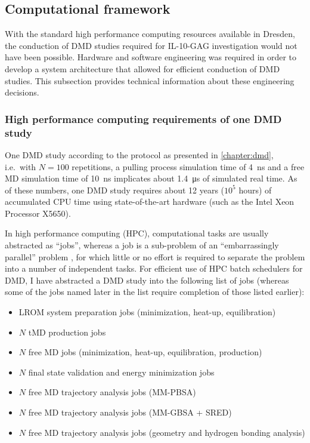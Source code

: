 \subsection{Computational framework}

With the standard high performance computing resources available in Dresden, the
conduction of DMD studies required for IL-10-GAG investigation would not have
been possible. Hardware and software engineering was required in order to
develop a system architecture that allowed for efficient conduction of DMD
studies. This subsection provides technical information about these engineering
decisions.

\subsubsection{High performance computing requirements of one DMD study}

One DMD study according to the protocol as presented in \cref{chapter:dmd},
i.e.\ with $N = 100$ repetitions, a pulling process simulation time of
\SI{4}{\nano\second} and a free MD simulation time of \SI{10}{\nano\second}
implicates about \SI{1.4}{\micro\second} of simulated real time. As of these
numbers, one DMD study requires about 12 years ($10^5$ hours) of accumulated CPU
time using state-of-the-art hardware (such as the Intel Xeon Processor X5650).

In high performance computing (HPC), computational tasks are usually abstracted as
\enquote{jobs}, whereas a job is a sub-problem of an \enquote{embarrassingly
parallel} problem \cite{heath1986hypercube}, for which little or no effort is
required to separate the problem into a number of independent tasks. For
efficient use of HPC batch schedulers for DMD, I have abstracted a DMD study
into the following list of jobs (whereas some of the jobs named later in the
list require completion of those listed earlier):

\begin{itemize}
\item LROM system preparation jobs (minimization, heat-up, equilibration)
\item $N$ tMD production jobs
\item $N$ free MD jobs (minimization, heat-up, equilibration, production)
\item $N$ final state validation and energy minimization jobs
\item $N$ free MD trajectory analysis jobs (MM-PBSA)
\item $N$ free MD trajectory analysis jobs (MM-GBSA + SRED)
\item $N$ free MD trajectory analysis jobs (geometry and hydrogen bonding
analysis)
\end{itemize}

